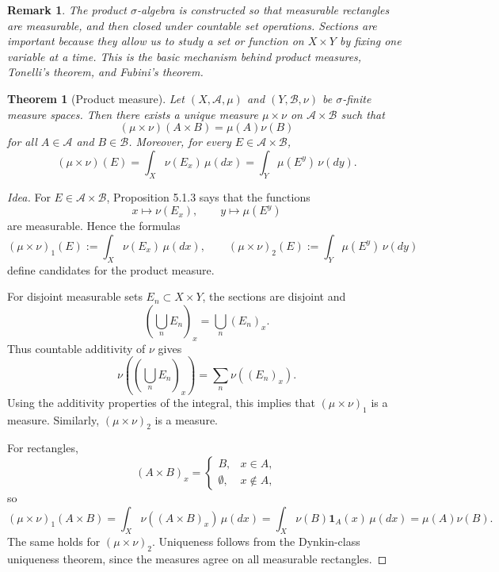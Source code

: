 \documentclass[12pt]{article}
\newtheorem{theorem}{Theorem}
\newtheorem{remark}{Remark}
\begin{document}
\begin{remark}
The product $\sigma$-algebra is constructed so that measurable rectangles are
measurable, and then closed under countable set operations. Sections are
important because they allow us to study a set or function on $X\times Y$ by
fixing one variable at a time. This is the basic mechanism behind product
measures, Tonelli's theorem, and Fubini's theorem.
\end{remark}

\begin{theorem}[Product measure]
Let $(X,\mathcal{A},\mu)$ and $(Y,\mathcal{B},\nu)$ be $\sigma$-finite measure
spaces. Then there exists a unique measure $\mu\times\nu$ on
$\mathcal{A}\times\mathcal{B}$ such that
\[
(\mu\times\nu)(A\times B)=\mu(A)\nu(B)
\]
for all $A\in\mathcal{A}$ and $B\in\mathcal{B}$. Moreover, for every
$E\in\mathcal{A}\times\mathcal{B}$,
\[
(\mu\times\nu)(E)
=
\int_X \nu(E_x)\,\mu(dx)
=
\int_Y \mu(E^y)\,\nu(dy).
\]
\end{theorem}

\begin{proof}[Idea]
For $E\in\mathcal{A}\times\mathcal{B}$, Proposition 5.1.3 says that the
functions
\[
x\mapsto \nu(E_x),
\qquad
y\mapsto \mu(E^y)
\]
are measurable. Hence the formulas
\[
(\mu\times\nu)_1(E):=\int_X \nu(E_x)\,\mu(dx),
\qquad
(\mu\times\nu)_2(E):=\int_Y \mu(E^y)\,\nu(dy)
\]
define candidates for the product measure.

For disjoint measurable sets $E_n\subset X\times Y$, the sections are disjoint
and
\[
\left(\bigcup_n E_n\right)_x=\bigcup_n (E_n)_x.
\]
Thus countable additivity of $\nu$ gives
\[
\nu\left(\left(\bigcup_n E_n\right)_x\right)
=
\sum_n \nu((E_n)_x).
\]
Using the additivity properties of the integral, this implies that
$(\mu\times\nu)_1$ is a measure. Similarly, $(\mu\times\nu)_2$ is a measure.

For rectangles,
\[
(A\times B)_x=
\begin{cases}
B, & x\in A,\\
\emptyset, & x\notin A,
\end{cases}
\]
so
\[
(\mu\times\nu)_1(A\times B)
=
\int_X \nu((A\times B)_x)\,\mu(dx)
=
\int_X \nu(B)\mathbf{1}_A(x)\,\mu(dx)
=
\mu(A)\nu(B).
\]
The same holds for $(\mu\times\nu)_2$. Uniqueness follows from the Dynkin-class
uniqueness theorem, since the measures agree on all measurable rectangles.
\end{proof}
\end{document}
